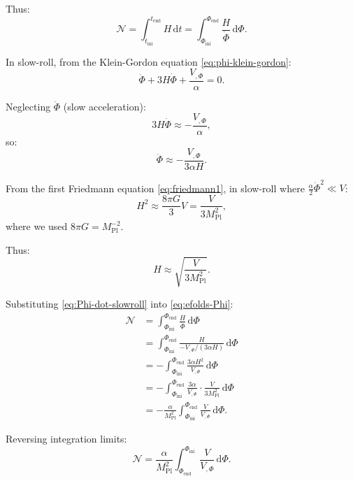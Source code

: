 \documentclass[11pt,a4paper]{article}
\numberwithin{equation}{section}
\theoremstyle{plain}
\theoremstyle{definition}
\theoremstyle{remark}
\newcommand{\dd}{\mathrm{d}}
\begin{document}
Thus:
\begin{equation}
\mathcal{N} = \int_{t_{\mathrm{ini}}}^{t_{\mathrm{end}}} H\,\dd t = \int_{\Phi_{\mathrm{ini}}}^{\Phi_{\mathrm{end}}} \frac{H}{\dot{\Phi}}\,\dd\Phi.
\label{eq:efolds-Phi}
\end{equation}

In slow-roll, from the Klein-Gordon equation \eqref{eq:phi-klein-gordon}:
\begin{equation}
\ddot{\Phi} + 3H\dot{\Phi} + \frac{V_{,\Phi}}{\alpha} = 0.
\end{equation}

Neglecting $\ddot{\Phi}$ (slow acceleration):
\begin{equation}
3H\dot{\Phi} \approx -\frac{V_{,\Phi}}{\alpha},
\end{equation}
so:
\begin{equation}
\dot{\Phi} \approx -\frac{V_{,\Phi}}{3\alpha H}.
\label{eq:Phi-dot-slowroll}
\end{equation}

From the first Friedmann equation \eqref{eq:friedmann1}, in slow-roll where $\frac{\alpha}{2}\dot{\Phi}^2 \ll V$:
\begin{equation}
H^2 \approx \frac{8\pi G}{3}V = \frac{V}{3M_{\mathrm{Pl}}^2},
\end{equation}
where we used $8\pi G = M_{\mathrm{Pl}}^{-2}$.

Thus:
\begin{equation}
H \approx \sqrt{\frac{V}{3M_{\mathrm{Pl}}^2}}.
\label{eq:H-slowroll}
\end{equation}

Substituting \eqref{eq:Phi-dot-slowroll} into \eqref{eq:efolds-Phi}:
\begin{align}
\mathcal{N} &= \int_{\Phi_{\mathrm{ini}}}^{\Phi_{\mathrm{end}}} \frac{H}{\dot{\Phi}}\,\dd\Phi\\
&= \int_{\Phi_{\mathrm{ini}}}^{\Phi_{\mathrm{end}}} \frac{H}{-V_{,\Phi}/(3\alpha H)}\,\dd\Phi\\
&= -\int_{\Phi_{\mathrm{ini}}}^{\Phi_{\mathrm{end}}} \frac{3\alpha H^2}{V_{,\Phi}}\,\dd\Phi\\
&= -\int_{\Phi_{\mathrm{ini}}}^{\Phi_{\mathrm{end}}} \frac{3\alpha}{V_{,\Phi}}\cdot\frac{V}{3M_{\mathrm{Pl}}^2}\,\dd\Phi\\
&= -\frac{\alpha}{M_{\mathrm{Pl}}^2}\int_{\Phi_{\mathrm{ini}}}^{\Phi_{\mathrm{end}}} \frac{V}{V_{,\Phi}}\,\dd\Phi.
\end{align}

Reversing integration limits:
\begin{equation}
\mathcal{N} = \frac{\alpha}{M_{\mathrm{Pl}}^2}\int_{\Phi_{\mathrm{end}}}^{\Phi_{\mathrm{ini}}} \frac{V}{V_{,\Phi}}\,\dd\Phi.
\label{eq:efolds-integral}
\end{equation}
\end{document}
